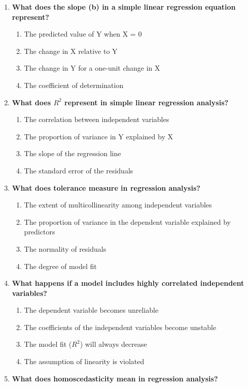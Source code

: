 \documentclass[
  letterpaper,
  DIV=11,
  numbers=noendperiod]{scrreprt}
\begin{document}
\begin{enumerate}
\def\labelenumi{\arabic{enumi}.}
\item
  \textbf{What does the slope (b) in a simple linear regression equation
  represent?}

  \begin{enumerate}
  \def\labelenumii{\alph{enumii}.}
  \item
    The predicted value of Y when X = 0
  \item
    The change in X relative to Y
  \item
    The change in Y for a one-unit change in X
  \item
    The coefficient of determination
  \end{enumerate}
\item
  \textbf{What does \(R^2\) represent in simple linear regression
  analysis?}

  \begin{enumerate}
  \def\labelenumii{\alph{enumii}.}
  \item
    The correlation between independent variables
  \item
    The proportion of variance in Y explained by X
  \item
    The slope of the regression line
  \item
    The standard error of the residuals
  \end{enumerate}
\item
  \textbf{What does tolerance measure in regression analysis?}

  \begin{enumerate}
  \def\labelenumii{\alph{enumii}.}
  \item
    The extent of multicollinearity among independent variables
  \item
    The proportion of variance in the dependent variable explained by
    predictors
  \item
    The normality of residuals
  \item
    The degree of model fit
  \end{enumerate}
\item
  \textbf{What happens if a model includes highly correlated independent
  variables?}

  \begin{enumerate}
  \def\labelenumii{\alph{enumii}.}
  \item
    The dependent variable becomes unreliable
  \item
    The coefficients of the independent variables become unstable
  \item
    The model fit (\(R^2\)) will always decrease
  \item
    The assumption of linearity is violated
  \end{enumerate}
\item
  \textbf{What does homoscedasticity mean in regression analysis?}


\end{enumerate}
\end{document}
